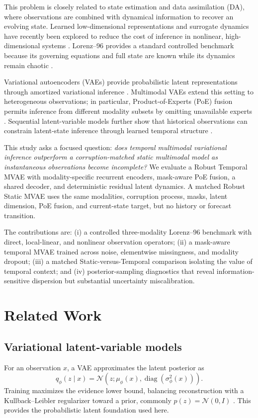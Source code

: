\documentclass[10pt,twocolumn]{article}
\begin{document}
This problem is closely related to state estimation and data assimilation (DA), where observations are combined with dynamical information to recover an evolving state. Learned low-dimensional representations and surrogate dynamics have recently been explored to reduce the cost of inference in nonlinear, high-dimensional systems \citep{peyron2021latent,brajard2020combining}. Lorenz--96 provides a standard controlled benchmark because its governing equations and full state are known while its dynamics remain chaotic \citep{lorenz1996predictability,law2016determining,terasaki2014effective}.

Variational autoencoders (VAEs) provide probabilistic latent representations through amortized variational inference \citep{kingma2014auto}. Multimodal VAEs extend this setting to heterogeneous observations; in particular, Product-of-Experts (PoE) fusion permits inference from different modality subsets by omitting unavailable experts \citep{wu2018multimodal}. Sequential latent-variable models further show that historical observations can constrain latent-state inference through learned temporal structure \citep{krishnan2017structured,karl2017deep,tan2020factorized}.

This study asks a focused question: \emph{does temporal multimodal variational inference outperform a corruption-matched static multimodal model as instantaneous observations become incomplete?} We evaluate a Robust Temporal MVAE with modality-specific recurrent encoders, mask-aware PoE fusion, a shared decoder, and deterministic residual latent dynamics. A matched Robust Static MVAE uses the same modalities, corruption process, masks, latent dimension, PoE fusion, and current-state target, but no history or forecast transition.

The contributions are: (i) a controlled three-modality Lorenz--96 benchmark with direct, local-linear, and nonlinear observation operators; (ii) a mask-aware temporal MVAE trained across noise, elementwise missingness, and modality dropout; (iii) a matched Static-versus-Temporal comparison isolating the value of temporal context; and (iv) posterior-sampling diagnostics that reveal information-sensitive dispersion but substantial uncertainty miscalibration.

\section{Related Work}
\subsection{Variational latent-variable models}
For an observation $x$, a VAE approximates the latent posterior as
\begin{equation}
q_{\phi}(z\mid x)=\mathcal{N}\!\left(z;\mu_{\phi}(x),\operatorname{diag}(\sigma_{\phi}^2(x))\right).
\end{equation}
Training maximizes the evidence lower bound, balancing reconstruction with a Kullback--Leibler regularizer toward a prior, commonly $p(z)=\mathcal{N}(0,I)$ \citep{kingma2014auto}. This provides the probabilistic latent foundation used here.
\end{document}
